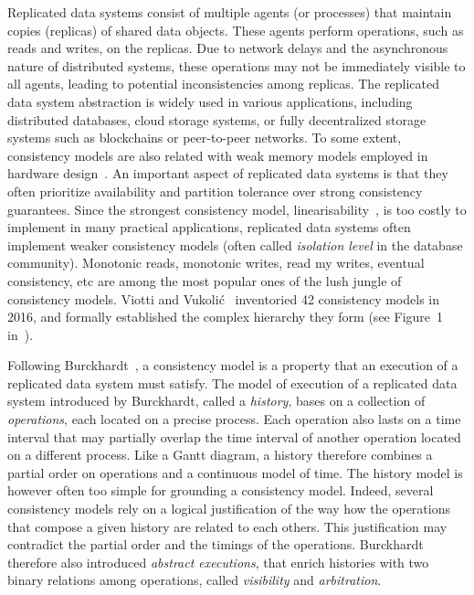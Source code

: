 Replicated data systems consist of multiple agents (or processes) that maintain copies (replicas) of shared data objects. 
These agents perform operations, such as reads and writes, on the replicas. Due to network delays and the asynchronous nature of distributed systems, these operations may not be immediately visible to all agents, leading to potential inconsistencies among replicas. 
The replicated data system abstraction is widely used in various applications, including distributed databases, cloud storage systems, or fully decentralized storage systems such as blockchains or peer-to-peer networks. To some extent, consistency models are also related with weak memory models employed in hardware design~\cite{Burckhardt13}.
An important aspect of replicated data systems is that they often prioritize availability and partition tolerance over strong consistency guarantees. 
Since the strongest consistency model, linearisability~\cite{HerlihyW90}, is too costly to implement in many practical applications, replicated data systems often implement weaker consistency models (often called \emph{isolation level} in the database community). Monotonic reads, monotonic writes, read my writes, eventual consistency, etc are among the most popular ones of the lush jungle of consistency models. Viotti and Vukoli\'{c}~\cite{ViottiVukolic} inventoried 42 consistency models in 2016, and formally established the complex hierarchy they form (see Figure~1 in~\cite{ViottiVukolic}).

Following Burckhardt~\cite{PrinciplesOfEventualConsistency}, a consistency model is a property that an execution of a replicated data system must satisfy. The model of execution of a replicated data system introduced by Burckhardt, called a \emph{history}, bases on a collection of \emph{operations}, each located on a precise process. Each operation also lasts on a time interval that may partially overlap the time interval of another operation located on a different process. 
Like a Gantt diagram, a history therefore combines a partial order on operations and a continuous model of time. The history model is however often too simple for grounding a consistency model. 
Indeed, several consistency models rely on a logical justification of the way how the operations that compose a given history are related to each others. This justification may contradict the partial order and the timings of the operations. Burckhardt~\cite{PrinciplesOfEventualConsistency} therefore also introduced \emph{abstract executions}, that enrich histories with two binary relations among operations, called \emph{visibility} and \emph{arbitration}. 

